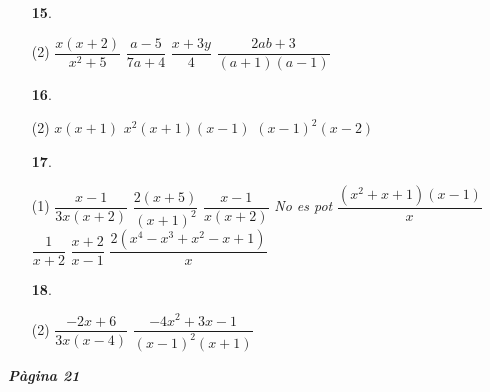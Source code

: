 \documentclass[a4paper, pdf, twoside]{book}
\begin{document}
\begin{multicols}{2}
\begin{enumerate}

 \item[\fontfamily{phv}\selectfont\color{blue}\textbf{15}. ] 
 \begin{tasks}[column-sep=1em, item-indent=1.3333em](2)
	 \task $\dfrac {x(x+2)}{x^2+5}$
	 \task $\dfrac {a-5}{7a+4}$
	 \task $\dfrac {x+3y}{4}$
	 \task $\dfrac {2ab+3}{(a+1)(a-1)}$
\end{tasks}
 \end{enumerate}
\begin{enumerate}
\vspace{0.25cm}



 \item[\fontfamily{phv}\selectfont\color{blue}\textbf{16}. ] 
 \begin{tasks}[column-sep=1em, item-indent=1.3333em](2)
	 \task $x(x+1)$
	 \task $x^2(x+1)(x-1)$
	 \task $(x-1)^2 (x-2)$
\end{tasks}
\vspace{0.25cm}



 \item[\fontfamily{phv}\selectfont\color{blue}\textbf{17}. ]  \scalebox{0.6}{\simbolclau } 
 \begin{tasks}[column-sep=1em, item-indent=1.3333em](1)
	 \task  $\dfrac {x-1}{3x(x+2)} $
	 \task $\dfrac {2(x+5)}{(x+1)^{2} } $
	 \task $\dfrac {x-1}{x(x+2)} $
	 \task \textit {No es pot}
	 \task* $\dfrac {(x^{2} +x+1)(x-1)}{x^{} } $
	 \task $\dfrac {1}{x+2} $
	 \task $\dfrac {x+2}{x-1} $
	 \task* $\dfrac {2(x^{4} -x^{3} +x^{2} -x+1)}{x} $
\end{tasks}
\vspace{0.25cm}



 \item[\fontfamily{phv}\selectfont\color{blue}\textbf{18}. ] 
 \begin{tasks}[column-sep=1em, item-indent=1.3333em](2)
	 \task $\dfrac {-2x+6}{3x(x-4)}$
	 \task* $\dfrac {-4x^2+3x-1}{(x-1)^2 (x+1)}$
\end{tasks}
 \end{enumerate}
\vspace{0.3cm}


{\textbf{\em Pàgina 21}} \hrulefill
\begin{enumerate}
\vspace{0.25cm}



\end{enumerate}
\end{multicols}
\end{document}
